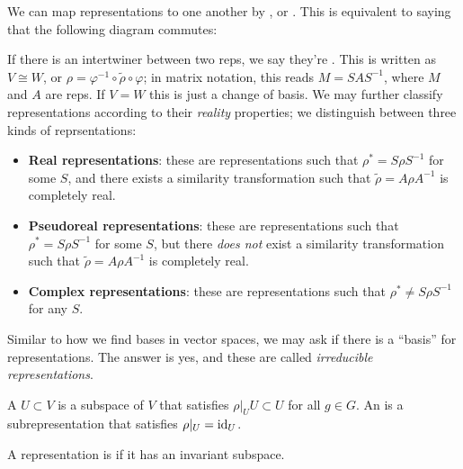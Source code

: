 \documentclass[11pt]{article}
\begin{document}
We can map representations to one another by , or . This is equivalent to
saying that the following diagram commutes:
\begin{center}
\end{center}
If there is an intertwiner between two reps, we say they're 
. This is written as $V \cong W$, or 
$\rho = \varphi^{-1} \circ \widetilde{\rho} \circ \varphi$;
in matrix notation, this reads $M = S A S^{-1}$, where $M$ and $A$ are reps.
If $V = W$ this is just a change of basis. We may further classify
representations according to their \emph{reality} properties; we
distinguish between three kinds of reprsentations:
\begin{itemize}
    \item \textbf{Real representations}: these are representations
    such that $\rho^* = S \rho S^{-1}$ for some $S$, and there exists
    a similarity transformation such that $\widetilde{\rho}= A \rho A^{-1}$ is
    completely real.
    \item \textbf{Pseudoreal representations}: these are representations
    such that $\rho^* = S \rho S^{-1}$ for some $S$, but there \emph{does not}
    exist a similarity transformation such that $\widetilde{\rho}= A \rho A^{-1}$ is
    completely real.
    \item \textbf{Complex representations}: these are representations
    such that $\rho^* \neq S \rho S^{-1}$ for any $S$.
\end{itemize}

Similar to how we find bases in vector spaces, we may ask if there is a 
``basis'' for representations. The answer is yes, and these are called 
\emph{irreducible representations}.

\begin{definition}
    A  $U \subset V$ is a subspace
    of $V$ that satisfies $\rho|_U U \subset U$ for all $g \in G$.
    An  is a subrepresentation that
    satisfies $\rho|_U = \operatorname{id}_U$.
\end{definition}

\begin{definition}
    A representation is  if it has an invariant subspace.
\end{definition}
\end{document}
